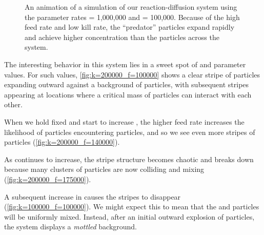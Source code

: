 \begin{figure}[h]
\begin{tabular}{c c c c}
\end{tabular}
\caption{An animation of a simulation of our reaction-diffusion system using the parameter rates  = 1,000,000 and  = 100,000. Because of the high feed rate and low kill rate, the ``predator''  particles expand rapidly and achieve higher concentration than the  particles across the system.}
\label{fig:k=100000_f=1000000}
\end{figure}

The interesting behavior in this system lies in a sweet spot of  and  parameter values. For such values, \autoref{fig:k=200000_f=100000} shows a clear stripe of  particles expanding outward against a background of  particles, with subsequent stripes appearing at locations where a critical mass of  particles can interact with each other.

When we hold  fixed and start to increase , the higher feed rate increases the likelihood of  particles encountering  particles, and so we see even more stripes of  particles (\autoref{fig:k=200000_f=140000}).

As  continues to increase, the stripe structure becomes chaotic and breaks down because many clusters of  particles are now colliding and mixing (\autoref{fig:k=200000_f=175000}).

A subsequent increase in  causes the stripes to disappear (\autoref{fig:k=100000_f=100000}). We might expect this to mean that the  and  particles will be uniformly mixed. Instead, after an initial outward explosion of  particles, the system displays a \textit{mottled} background.

